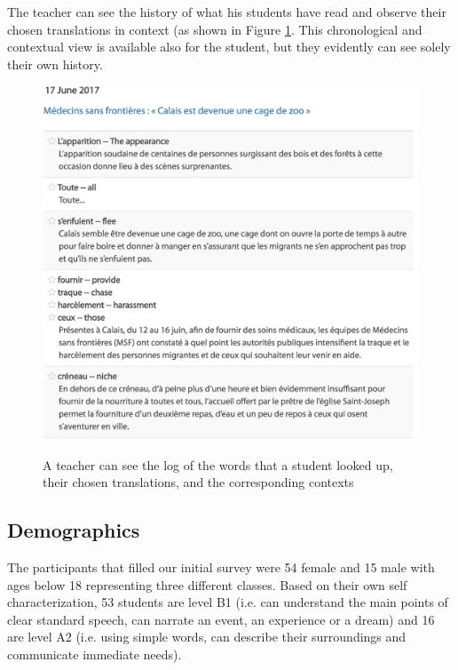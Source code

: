 The teacher can see the history of what his students have read and observe their chosen translations in context (as shown in Figure \ref{fig:teacher}. This chronological and contextual view is available also for the student, but they evidently can see solely their own history.


\begin{figure}[h!]
\centering
  \includegraphics[width=0.7\columnwidth]{figures/teacher_dashboard.png}
  \caption{A teacher can see the log of the words that a student looked up, their chosen translations, and the corresponding contexts}{
  \label{fig:teacher}
  }
\end{figure}





\subsection{Demographics}


The participants that filled our initial survey were 54 female and 15 male with ages below 18 representing three different classes. Based on their own self characterization, 53 students are level B1 (i.e. can understand the main points of clear standard speech, can narrate an event, an experience or a dream) and 16 are level A2 (i.e. using simple words, can describe their surroundings and communicate immediate needs). 














